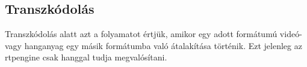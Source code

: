 %
%
%
%

\subsection{Transzkódolás}

Transzkódolás alatt azt a folyamatot értjük, amikor egy adott formátumú videó- vagy 
hanganyag egy másik formátumba való átalakítása történik. Ezt jelenleg az rtpengine 
csak hanggal tudja megvalósítani. 

